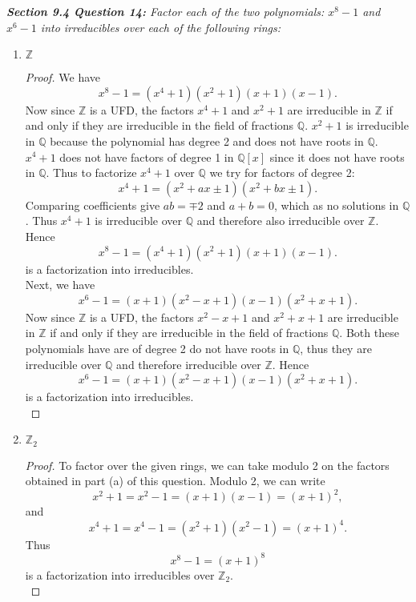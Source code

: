 \documentclass{article}
\begin{document}
\it \textbf{Section 9.4 Question 14:} Factor each of the two polynomials:
  $x^8-1$ and $x^6-1$ into irreducibles over each of the following rings:
  \begin{enumerate}[label={(\alph*)}]
    \item $\mathbb{Z}$
      \begin{proof}
        We have
        \[x^8-1 =(x^4+1)(x^2+1)(x+1)(x-1).\]
        Now since $\mathbb{Z}$ is a UFD, the factors $x^4+1$ and $x^2+1$
        are irreducible in $\mathbb{Z}$ if and only if they are irreducible
        in the field of fractions $\mathbb{Q}$. $x^2+1$ is irreducible in
        $\mathbb{Q}$ because the polynomial has degree 2 and does not have
        roots in $\mathbb{Q}$. $x^4+1$ does not have factors of degree 1 in
        $\mathbb{Q}[x]$ since it does not have roots in $\mathbb{Q}$. Thus
        to factorize $x^4+1$ over $\mathbb{Q}$ we try for factors of degree
        2:
        \[x^4+1=(x^2+ax\pm1)(x^2+bx\pm1).\]
        Comparing coefficients give $ab=\mp2$ and $a+b=0$, which as no
        solutions in $\mathbb{Q}$. Thus $x^4+1$ is irreducible over
        $\mathbb{Q}$ and therefore also irreducible over $\mathbb{Z}$.
        Hence
        \[x^8-1 =(x^4+1)(x^2+1)(x+1)(x-1).\]
        is a factorization into irreducibles. \\

        Next, we have
        \[x^6-1 =(x+1)(x^2-x+1)(x-1)(x^2+x+1).\]
        Now since $\mathbb{Z}$ is a UFD, the factors $x^2-x+1$ and $x^2+x+1$
        are irreducible in $\mathbb{Z}$ if and only if they are irreducible
        in the field of fractions $\mathbb{Q}$. Both these polynomials have
        are of degree 2 do not have roots in $\mathbb{Q}$, thus they are
        irreducible over $\mathbb{Q}$ and therefore irreducible over
        $\mathbb{Z}$. Hence
        \[x^6-1 =(x+1)(x^2-x+1)(x-1)(x^2+x+1).\]
        is a factorization into irreducibles. \\
      \end{proof}

    \item $\mathbb{Z}_2$
      \begin{proof}
        To factor over the given rings, we can take modulo 2 on the factors
        obtained in part (a) of this question. Modulo 2, we can write
        \[x^2+1= x^2-1= (x+1)(x-1)= (x+1)^2,\]
        and
        \[x^4+1= x^4-1= (x^2+1)(x^2-1)= (x+1)^4.\]
        Thus
        \[x^8-1 =(x+1)^8\]
        is a factorization into irreducibles over $\mathbb{Z}_2$. \\


\end{proof}
\end{enumerate}
\end{document}
